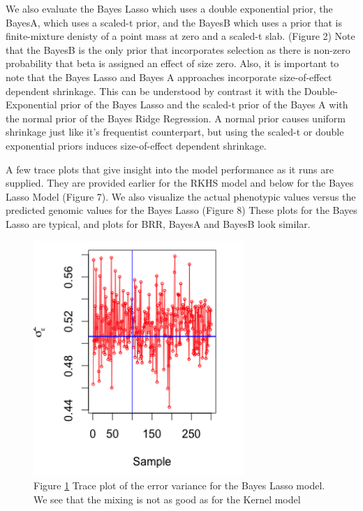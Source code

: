 \documentclass{sig-alternate-05-2015}
\begin{document}
We also evaluate the Bayes Lasso which uses a double exponential prior, the BayesA, which uses a scaled-t prior, and the BayesB which uses a
prior that is finite-mixture denisty of a point mass at zero and a scaled-t slab. (Figure 2)
Note that the BayesB is the only prior that incorporates selection as there is non-zero probability that beta is assigned an effect of size zero. Also,
it is important to note that the Bayes Lasso and Bayes A approaches incorporate size-of-effect dependent shrinkage. This can be understood by contrast it
with the Double-Exponential prior of the Bayes Lasso and the scaled-t prior of the Bayes A with the normal prior of the Bayes Ridge Regression. A normal prior
causes uniform shrinkage just like it's frequentist counterpart, but using the scaled-t or double exponential priors induces size-of-effect dependent shrinkage. \cite{perez_genome-wide_2014}

A few trace plots that give insight into the model performance as it runs are supplied. They are provided earlier for the RKHS model and below for the Bayes Lasso Model (Figure 7).
We also visualize the actual phenotypic values versus the predicted genomic values for the Bayes Lasso (Figure 8)
These plots for the Bayes Lasso are typical, and plots for BRR, BayesA and BayesB look similar.

\begin{figure}
  \includegraphics[width=8cm]{./Images/BLvarE.png}
  \centering
  \caption{Figure \ref{fig:BLvarE} Trace plot of the error variance for the Bayes Lasso model. We see that the mixing is not as good as for the
  Kernel model}
  \label{fig:BLvarE}
\end{figure}
\end{document}
